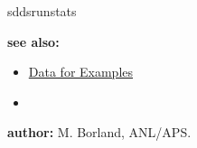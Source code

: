 \begin{sddsprog}{sddsrunstats}
  \item \textbf{see also:}
    \begin{itemize}
    \item \hyperref[exampleData]{Data for Examples}
    \item {}
    \end{itemize}

  \item \textbf{author:} M. Borland, ANL/APS.
\end{sddsprog}
